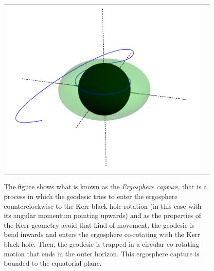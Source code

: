 \clearpage

\begin{figure}
\centering
 \hspace*{-0.05\textwidth}
\begin{tabular}{cc}
\centerline{\includegraphics[width=1\textwidth]{img/Chapter4/Reversal.png}}
\end{tabular}
\caption{The figure shows what is known as the \textit{Ergosphere capture}, that is a process in which the geodesic tries to enter the ergosphere counterclockwise to the Kerr black hole rotation (in this case with its angular momentum pointing upwards) and as the properties of the Kerr geometry avoid that kind of movement, the geodesic is bend inwards and enters the ergosphere co-rotating with the Kerr black hole. Then, the geodesic is trapped in a circular co-rotating motion that ends in the outer horizon. This ergosphere capture is bounded to the equatorial plane.}
\end{figure}

\clearpage

